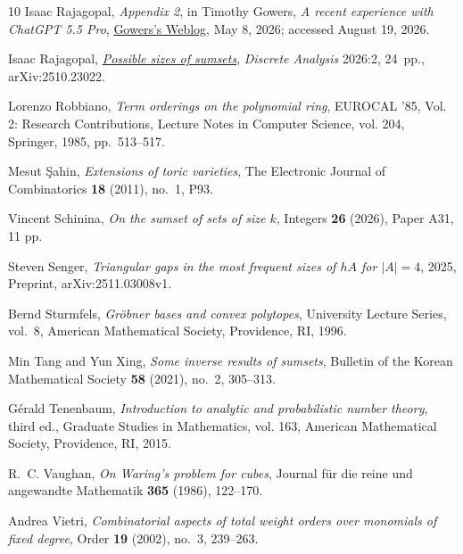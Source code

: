 \documentclass[11pt,reqno]{amsart}
\theoremstyle{definition}
\theoremstyle{remark}
\begin{document}
\begin{sloppypar}
\begin{thebibliography}{10}
Isaac Rajagopal, \emph{Appendix 2}, in Timothy Gowers,
\emph{A recent experience with {ChatGPT 5.5 Pro}},
\href{https://gowers.wordpress.com/2026/05/08/a-recent-experience-with-chatgpt-5-5-pro/}{Gowers's Weblog},
May 8, 2026; accessed August 19, 2026.

Isaac Rajagopal,
\href{https://discreteanalysisjournal.com/article/165102-possible-sizes-of-sumsets}{\emph{Possible sizes of sumsets}},
\emph{Discrete Analysis} 2026:2, 24~pp.,
arXiv:2510.23022.

Lorenzo Robbiano, \emph{Term orderings on the polynomial ring}, EUROCAL '85, Vol. 2: Research Contributions, Lecture Notes in Computer Science, vol. 204, Springer, 1985, pp.~513--517.

Mesut {\c{S}}ahin, \emph{Extensions of toric varieties}, The Electronic Journal of Combinatorics \textbf{18} (2011), no.~1, P93.

Vincent Schinina, \emph{On the sumset of sets of size {$k$}}, Integers \textbf{26} (2026), Paper A31, 11 pp.

Steven Senger, \emph{Triangular gaps in the most frequent sizes of {$hA$} for {$|A|=4$}}, 2025, Preprint, arXiv:2511.03008v1.

Bernd Sturmfels, \emph{{Gr\"obner} bases and convex polytopes}, University Lecture Series, vol.~8, American Mathematical Society, Providence, RI, 1996.

Min Tang and Yun Xing, \emph{Some inverse results of sumsets}, Bulletin of the Korean Mathematical Society \textbf{58} (2021), no.~2, 305--313.

G{\'e}rald Tenenbaum, \emph{Introduction to analytic and probabilistic number theory}, third ed., Graduate Studies in Mathematics, vol. 163, American Mathematical Society, Providence, RI, 2015.

R.~C. Vaughan, \emph{On {Waring}'s problem for cubes}, Journal f\"ur die reine und angewandte Mathematik \textbf{365} (1986), 122--170.

Andrea Vietri, \emph{Combinatorial aspects of total weight orders over monomials of fixed degree}, Order \textbf{19} (2002), no.~3, 239--263.

\end{thebibliography}
\end{sloppypar}
\end{document}
